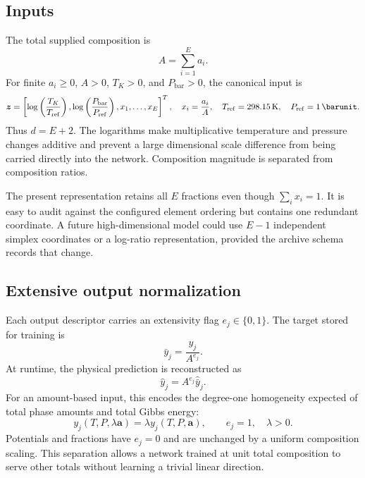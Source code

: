 \documentclass[11pt]{article}
\begin{document}
\subsection{Inputs}

The total supplied composition is
\begin{equation}
  A=\sum_{i=1}^{E}a_i.
  \label{eq:total}
\end{equation}
For finite \(a_i\geq0\), \(A>0\), \(T_K>0\), and \(P_{\mathrm{bar}}>0\), the canonical input is
\begin{equation}
  \boldsymbol{z}
  =
  \left[
    \log\left(\frac{T_K}{T_{\mathrm{ref}}}\right),
    \log\left(\frac{P_{\mathrm{bar}}}{P_{\mathrm{ref}}}\right),
    x_1,\ldots,x_E
  \right]^T,
  \quad
  x_i=\frac{a_i}{A},
  \quad
  T_{\mathrm{ref}}=\SI{298.15}{\kelvin},
  \quad
  P_{\mathrm{ref}}=\SI{1}{\barunit}.
  \label{eq:canonical-input}
\end{equation}
Thus \(d=E+2\).  The logarithms make multiplicative temperature and pressure changes additive and
prevent a large dimensional scale difference from being carried directly into the network.
Composition magnitude is separated from composition ratios.

The present representation retains all \(E\) fractions even though
\(\sum_i x_i=1\).  It is easy to audit against the configured element ordering but contains one
redundant coordinate.  A future high-dimensional model could use \(E-1\) independent simplex
coordinates or a log-ratio representation, provided the archive schema records that change.

\subsection{Extensive output normalization}

Each output descriptor carries an extensivity flag \(e_j\in\{0,1\}\).  The target stored for
training is
\begin{equation}
  \bar y_j=\frac{y_j}{A^{e_j}}.
  \label{eq:extensive-normalization}
\end{equation}
At runtime, the physical prediction is reconstructed as
\begin{equation}
  \widehat y_j=A^{e_j}\widehat{\bar y}_j.
  \label{eq:extensive-rescaling}
\end{equation}
For an amount-based input, this encodes the degree-one homogeneity expected of total phase amounts
and total Gibbs energy:
\begin{equation}
  y_j(T,P,\lambda\boldsymbol{a})=\lambda y_j(T,P,\boldsymbol{a}),
  \qquad e_j=1,\quad\lambda>0.
  \label{eq:homogeneity}
\end{equation}
Potentials and fractions have \(e_j=0\) and are unchanged by a uniform composition scaling.  This
separation allows a network trained at unit total composition to serve other totals without
learning a trivial linear direction.
\end{document}
